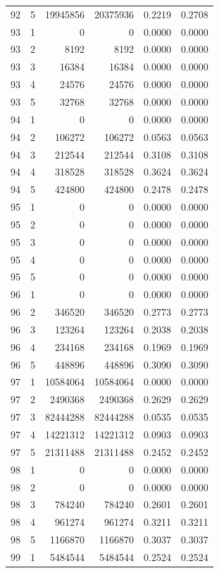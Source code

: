 \begin{longtable}{rrrrrr}
92 & 5 & 19945856 & 20375936 & 0.2219 & 0.2708 \\
93 & 1 & 0 & 0 & 0.0000 & 0.0000 \\
93 & 2 & 8192 & 8192 & 0.0000 & 0.0000 \\
93 & 3 & 16384 & 16384 & 0.0000 & 0.0000 \\
93 & 4 & 24576 & 24576 & 0.0000 & 0.0000 \\
93 & 5 & 32768 & 32768 & 0.0000 & 0.0000 \\
94 & 1 & 0 & 0 & 0.0000 & 0.0000 \\
94 & 2 & 106272 & 106272 & 0.0563 & 0.0563 \\
94 & 3 & 212544 & 212544 & 0.3108 & 0.3108 \\
94 & 4 & 318528 & 318528 & 0.3624 & 0.3624 \\
94 & 5 & 424800 & 424800 & 0.2478 & 0.2478 \\
95 & 1 & 0 & 0 & 0.0000 & 0.0000 \\
95 & 2 & 0 & 0 & 0.0000 & 0.0000 \\
95 & 3 & 0 & 0 & 0.0000 & 0.0000 \\
95 & 4 & 0 & 0 & 0.0000 & 0.0000 \\
95 & 5 & 0 & 0 & 0.0000 & 0.0000 \\
96 & 1 & 0 & 0 & 0.0000 & 0.0000 \\
96 & 2 & 346520 & 346520 & 0.2773 & 0.2773 \\
96 & 3 & 123264 & 123264 & 0.2038 & 0.2038 \\
96 & 4 & 234168 & 234168 & 0.1969 & 0.1969 \\
96 & 5 & 448896 & 448896 & 0.3090 & 0.3090 \\
97 & 1 & 10584064 & 10584064 & 0.0000 & 0.0000 \\
97 & 2 & 2490368 & 2490368 & 0.2629 & 0.2629 \\
97 & 3 & 82444288 & 82444288 & 0.0535 & 0.0535 \\
97 & 4 & 14221312 & 14221312 & 0.0903 & 0.0903 \\
97 & 5 & 21311488 & 21311488 & 0.2452 & 0.2452 \\
98 & 1 & 0 & 0 & 0.0000 & 0.0000 \\
98 & 2 & 0 & 0 & 0.0000 & 0.0000 \\
98 & 3 & 784240 & 784240 & 0.2601 & 0.2601 \\
98 & 4 & 961274 & 961274 & 0.3211 & 0.3211 \\
98 & 5 & 1166870 & 1166870 & 0.3037 & 0.3037 \\
99 & 1 & 5484544 & 5484544 & 0.2524 & 0.2524 \\

\end{longtable}
